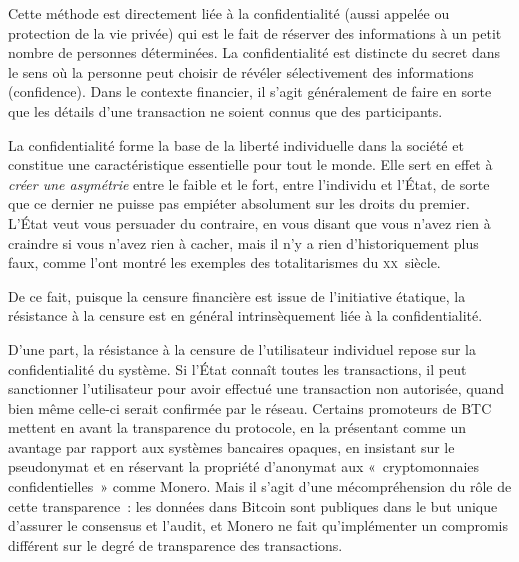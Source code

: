 Cette méthode est directement liée à la confidentialité (aussi appelée  ou protection de la vie privée) qui est le fait de réserver des informations à un petit nombre de personnes déterminées. La confidentialité est distincte du secret dans le sens où la personne peut choisir de révéler sélectivement des informations (confidence). Dans le contexte financier, il s'agit généralement de faire en sorte que les détails d'une transaction ne soient connus que des participants.

La confidentialité forme la base de la liberté individuelle dans la société et constitue une caractéristique essentielle pour tout le monde. Elle sert en effet à \emph{créer une asymétrie} entre le faible et le fort, entre l'individu et l'État, de sorte que ce dernier ne puisse pas empiéter absolument sur les droits du premier. L'État veut vous persuader du contraire, en vous disant que vous n'avez rien à craindre si vous n'avez rien à cacher, mais il n'y a rien d'historiquement plus faux, comme l'ont montré les exemples des totalitarismes du \textsc{xx}\ieme{}~siècle.


De ce fait, puisque la censure financière est issue de l'initiative étatique, la résistance à la censure est en général intrinsèquement liée à la confidentialité.

D'une part, la résistance à la censure de l'utilisateur individuel repose sur la confidentialité du système. Si l'État connaît toutes les transactions, il peut sanctionner l'utilisateur pour avoir effectué une transaction non autorisée, quand bien même celle-ci serait confirmée par le réseau. Certains promoteurs de BTC mettent en avant la transparence du protocole, en la présentant comme un avantage par rapport aux systèmes bancaires opaques, en insistant sur le pseudonymat et en réservant la propriété d'anonymat aux «~cryptomonnaies confidentielles~» comme Monero. Mais il s'agit d'une mécompréhension du rôle de cette transparence~: les données dans Bitcoin sont publiques dans le but unique d'assurer le consensus et l'audit, et Monero ne fait qu'implémenter un compromis différent sur le degré de transparence des transactions.

